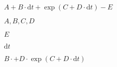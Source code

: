 \documentclass{article}
\begin{document}
$A + B\cdot \mathrm{d}t + \exp( C + D\cdot \mathrm{d}t ) - E$
\pagebreak

$A,B,C,D$
\pagebreak

$E$
\pagebreak

$\mathrm{d}t$
\pagebreak

$B\cdot + D\cdot\exp( C + D\cdot \mathrm{d}t )$
\pagebreak
\end{document}

